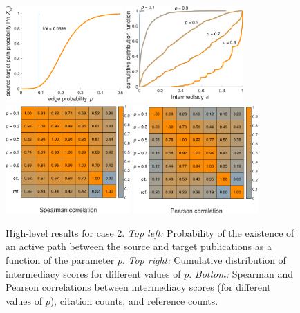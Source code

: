 \documentclass{article}
\theoremstyle{definition}
\begin{document}
\begin{figure}[t]
  \centering%
  \includegraphics[width=0.4\textwidth]{phist_peerrev}\linewidth
  \includegraphics[width=0.4\textwidth]{distributions_peerrev}\\\linewidth
  \includegraphics[width=0.425\textwidth]{spearman_peerrev}\linewidth
  \includegraphics[width=0.425\textwidth]{pearson_peerrev}
  \caption{High-level results for case 2. \emph{Top left:} Probability of the existence of an active path between the source and target publications as a function of the parameter $p$. \emph{Top right:} Cumulative distribution of intermediacy scores for different values of $p$. \emph{Bottom:} Spearman and Pearson correlations between intermediacy scores (for different values of $p$), citation counts, and reference counts.}
  \label{fig:pr}
\end{figure}
\end{document}
